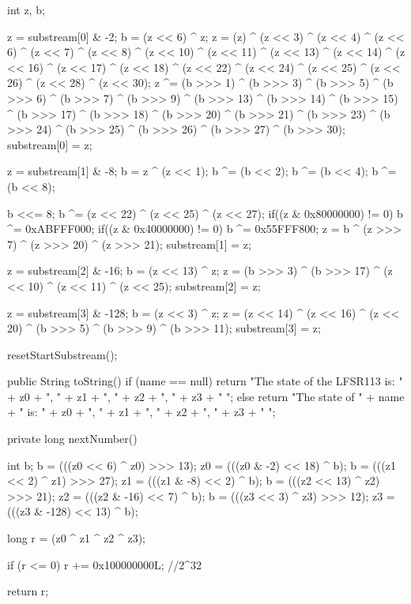 \begin{code}
\begin{hide}
{      int z, b;

      z = substream[0] & -2;
      b = (z <<  6) ^ z;
      z = (z) ^ (z << 3) ^ (z << 4) ^ (z << 6) ^ (z << 7) ^
         (z << 8) ^ (z << 10) ^ (z << 11) ^ (z << 13) ^ (z << 14) ^
         (z << 16) ^ (z << 17) ^ (z << 18) ^ (z << 22) ^
         (z << 24) ^ (z << 25) ^ (z << 26) ^ (z << 28) ^ (z << 30);
      z ^= (b >>> 1) ^ (b >>> 3) ^ (b >>> 5) ^ (b >>> 6) ^
         (b >>> 7) ^ (b >>> 9) ^ (b >>> 13) ^ (b >>> 14) ^
         (b >>> 15) ^ (b >>> 17) ^ (b >>> 18) ^ (b >>> 20) ^
         (b >>> 21) ^ (b >>> 23) ^ (b >>> 24) ^ (b >>> 25) ^
         (b >>> 26) ^ (b >>> 27) ^ (b >>> 30);
      substream[0] = z;


      z = substream[1] & -8;
      b = z ^ (z << 1);
      b ^= (b << 2);
      b ^= (b << 4);
      b ^= (b << 8);

      b <<= 8;
      b ^= (z << 22) ^ (z << 25) ^ (z << 27);
      if((z & 0x80000000) != 0) b ^= 0xABFFF000;
      if((z & 0x40000000) != 0) b ^= 0x55FFF800;
      z = b ^ (z >>> 7) ^ (z >>> 20) ^ (z >>> 21);
      substream[1] = z;


      z = substream[2] & -16;
      b = (z <<  13) ^ z;
      z = (b >>> 3) ^ (b >>> 17) ^
         (z << 10) ^ (z << 11) ^ (z << 25);
      substream[2] = z;


      z = substream[3] & -128;
      b = (z <<  3) ^ z;
      z = (z << 14) ^ (z << 16) ^ (z << 20) ^
         (b >>> 5) ^ (b >>> 9) ^ (b >>> 11);
      substream[3] = z;

      resetStartSubstream();
   }


   public String toString()  {
      if (name == null)
         return "The state of the LFSR113 is: { " +
                z0 + ", " + z1 + ", " + z2 + ", " + z3 + " }";
      else
         return "The state of " + name + " is: { " +
                z0 + ", " + z1 + ", " + z2 + ", " + z3 + " }";
   }

   private long nextNumber() {
      int b;
      b  = (((z0 <<   6) ^ z0) >>> 13);
      z0 = (((z0 &   -2) << 18) ^ b);
      b  = (((z1 <<   2) ^ z1) >>> 27);
      z1 = (((z1 &   -8) <<  2) ^ b);
      b  = (((z2 <<  13) ^ z2) >>> 21);
      z2 = (((z2 &  -16) <<  7) ^ b);
      b  = (((z3 <<   3) ^ z3) >>> 12);
      z3 = (((z3 & -128) << 13) ^ b);

      long r = (z0 ^ z1 ^ z2 ^ z3);

      if (r <= 0)
         r += 0x100000000L;      //2^32

      return r;
   }


\end{hide}
\end{code}
